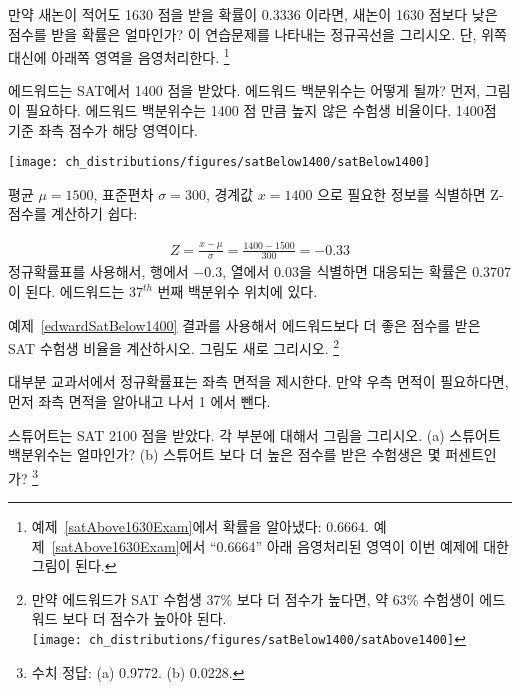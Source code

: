 \begin{exercise}
만약 새논이 적어도 1630 점을 받을 확률이 0.3336 이라면, 새논이 1630 점보다 낮은 점수를 받을 확률은 얼마인가? 이 연습문제를 나타내는 정규곡선을 그리시오. 단, 위쪽 대신에 아래쪽 영역을 음영처리한다. 
\footnote{예제~\ref{satAbove1630Exam}에서 확률을 알아냈다: 0.6664. 예제~\ref{satAbove1630Exam}에서 ``0.6664'' 아래 음영처리된 영역이 이번 예제에 대한 그림이 된다.}
\end{exercise}

\begin{example}{에드워드는 SAT에서 1400 점을 받았다. 에드워드 백분위수는 어떻게 될까?} \label{edwardSatBelow1400}
먼저, 그림이 필요하다. 에드워드 백분위수는 1400 점 만큼 높지 않은 수험생 비율이다. 1400점 기준 좌측 점수가 해당 영역이다.
\begin{center}
\texttt{[image: ch\_distributions/figures/satBelow1400/satBelow1400]}
\end{center}

평균 $\mu=1500$, 표준편차 $\sigma=300$, 경계값 $x=1400$ 으로 필요한 정보를 식별하면 Z-점수를 계산하기 쉽다:

\begin{eqnarray*}
Z = \frac{x - \mu}{\sigma} = \frac{1400 - 1500}{300} = -0.33
\end{eqnarray*}
정규확률표를 사용해서, 행에서 $-0.3$, 열에서 $0.03$을 식별하면 대응되는 확률은 $0.3707$이 된다. 에드워드는 $37^{th}$ 번째 백분위수 위치에 있다.
\end{example}

\begin{exercise}
예제~\ref{edwardSatBelow1400} 결과를 사용해서 에드워드보다 더 좋은 점수를 받은 SAT 수험생 비율을 계산하시오. 그림도 새로 그리시오.
\footnote{만약 에드워드가 SAT 수험생 37\% 보다 더 점수가 높다면, 약 63\% 수험생이 에드워드 보다 더 점수가 높아야 된다.\\
\texttt{[image: ch\_distributions/figures/satBelow1400/satAbove1400]}}
\end{exercise}

\begin{tipBox}{
대부분 교과서에서 정규확률표는 좌측 면적을 제시한다. 만약 우측 면적이 필요하다면, 먼저 좌측 면적을 알아내고 나서 1 에서 뺀다.}
\end{tipBox}

\begin{exercise}
스튜어트는 SAT 2100 점을 받았다. 각 부분에 대해서 그림을 그리시오. (a) 스튜어트 백분위수는 얼마인가? (b) 스튜어트 보다 더 높은 점수를 받은 수험생은 몇 퍼센트인가?
\footnote{수치 정답: (a) 0.9772. (b) 0.0228.}
\end{exercise}

